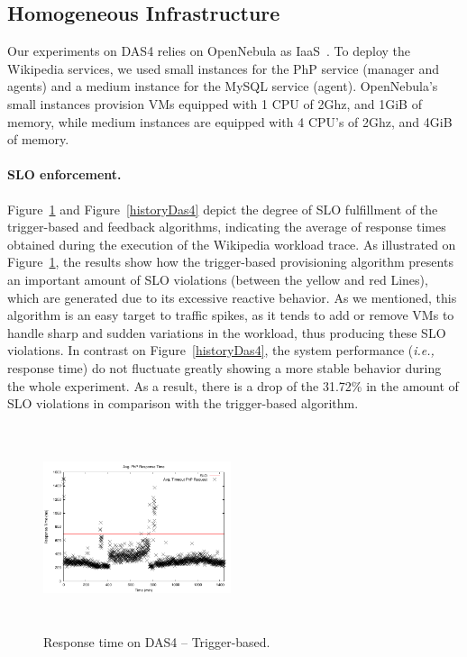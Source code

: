 \subsection*{Homogeneous Infrastructure}

Our experiments on DAS4 relies on OpenNebula as IaaS~\cite{sotomayor_virtual_2009}. To deploy the Wikipedia services, we used small instances for the PhP service (manager and agents) and a medium instance for the MySQL service (agent). OpenNebula's small instances provision VMs equipped with 1 CPU of 2Ghz, and 1GiB of memory, while medium instances are equipped with 4 CPU's of 2Ghz, and 4GiB of memory.

\paragraph{SLO enforcement.}
Figure~\ref{naiveDas4} and Figure~\ref{historyDas4} depict the degree of SLO fulfillment of the trigger-based and feedback algorithms, indicating the average of response times obtained during the execution of the Wikipedia workload trace. As illustrated on Figure~\ref{naiveDas4}, the results show how the trigger-based provisioning algorithm presents an important amount of SLO violations (between the yellow and red Lines), which are generated due to its excessive reactive behavior. As we mentioned, this algorithm is an easy target to traffic spikes, as it tends to add or remove VMs to handle sharp and sudden variations in the workload, thus producing these SLO violations. In contrast on Figure~\ref{historyDas4}, the system performance (\emph{i.e.,} response time) do not fluctuate greatly showing a more stable behavior during the whole experiment. As a result, there is a drop of the 31.72\% in the amount of SLO violations in comparison with the trigger-based algorithm. 


\begin{figure}

\begin{center}
\includegraphics[width=0.49\textwidth, height=6cm]{./images/homogeneous/avgTimeout_PhP_trigger}
\end{center}
\vspace{-5mm}
\caption{Response time on DAS4 -- Trigger-based.}
\label{naiveDas4}
\end{figure}

